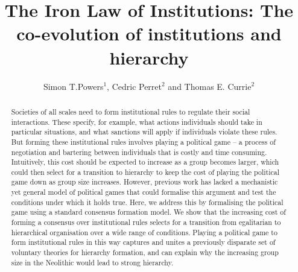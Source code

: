 \documentclass{rstb}
\begin{document}
\title{The Iron Law of Institutions: The co-evolution of institutions and hierarchy}
\author{Simon T.Powers$^{1}$, Cedric Perret$^{2}$ and Thomas E. Currie$^{2}$}
\address{$^{1}$Edinburgh Napier University, Edinburgh EH10 5DT\\ 
$^{2}$University of Exeter, Penryn TR10 9FE}
\subject{}
\begin{abstract}

Societies of all scales need to form institutional rules to regulate their social interactions. These specify, for example, what actions individuals should take in particular situations, and what sanctions will apply if individuals violate these rules. But forming these institutional rules involves playing a political game -- a process of negotiation and bartering between individuals that is costly and time consuming. Intuitively, this cost should be expected to increase as a group becomes larger, which could then select for a transition to hierarchy to keep the cost of playing the political game down as group size increases. However, previous work has lacked a mechanistic yet general model of political games that could formalise this argument and test the conditions under which it holds true. Here, we address this by formalising the political game using a standard consensus formation model. We show that the increasing cost of forming a consensus over institutional rules selects for a transition from egalitarian to hierarchical organisation over a wide range of conditions. Playing a political game to form institutional rules in this way captures and unites a previously disparate set of voluntary theories for hierarchy formation, and can explain why the increasing group size in the Neolithic would lead to strong hierarchy. 


\end{abstract}

\rsbreak
\end{document}
